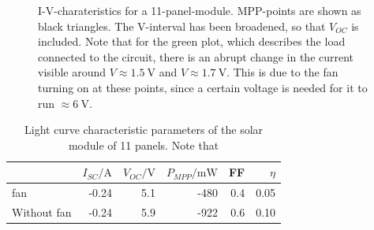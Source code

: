 \documentclass[english,  %
parskip=full,  %
headsepline]{scrartcl}
\begin{document}
\begin{figure}[H]
    \centering
    
    \caption{I-V-charateristics for a 11-panel-module. MPP-points are shown as black triangles. The V-interval has been broadened, so that $V_{OC}$ is included. Note that for the green plot, which describes the load connected to the circuit, there is an abrupt change in the current visible around $V \approx\SI{1.5}{\volt}$ and $V \approx\SI{1.7}{\volt}$. This is due to the fan turning on at these points, since a certain voltage is needed for it to run $\approx \SI{6}{\volt}$.}
    \label{fig:C4}
\end{figure}
\begin{table}[H]
\label{tab:C4}
\centering
    \caption{Light curve characteristic parameters of the solar module of 11 panels. Note that}
\begin{tabular}{lrrrrr}
\toprule
&$I_{SC} / \si{\ampere}$&$V_{OC} / \si{\volt}$&$P_{MPP}/ \si{\milli\watt}$&FF&$\eta$\\
\midrule
fan &   -0.24&5.1&-480&0.4&0.05 \\
Without fan & -0.24&5.9&-922&0.6&0.10 \\
\bottomrule
\end{tabular}
\end{table}
\end{document}
